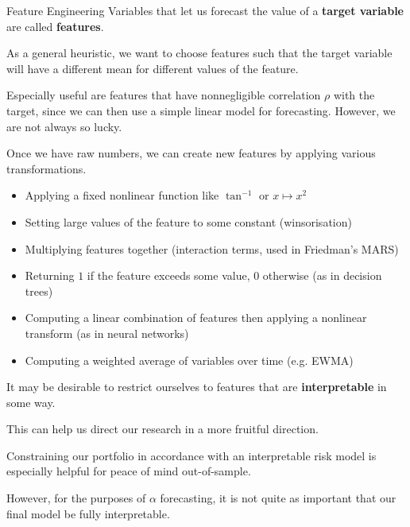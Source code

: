 \documentclass{beamer}
\begin{document}
\begin{frame}{Feature Engineering}
	Variables that let us forecast the value of a \textbf{target variable} are called \textbf{features}.

	As a general heuristic, we want to choose features such that the target variable will have a different mean for different values of the feature.

	Especially useful are features that have nonnegligible correlation $\rho$ with the target, since we can then use a simple linear model for forecasting. However, we are not always so lucky.

	Once we have raw numbers, we can create new features by applying various transformations.

	\begin{itemize}
		\item Applying a fixed nonlinear function like $\tan^{-1}$ or $x\mapsto x^2$
		\item Setting large values of the feature to some constant (winsorisation)
		\item Multiplying features together (interaction terms, used in Friedman's MARS)
		\item Returning $1$ if the feature exceeds some value, $0$ otherwise (as in decision trees)
		\item Computing a linear combination of features then applying a nonlinear transform (as in neural networks) 
		\item Computing a weighted average of variables over time (e.g. EWMA)
	\end{itemize}

	It may be desirable to restrict ourselves to features that are \textbf{interpretable} in some way.

	This can help us direct our research in a more fruitful direction.

	Constraining our portfolio in accordance with an interpretable risk model is especially helpful for peace of mind out-of-sample.

	However, for the purposes of $\alpha$ forecasting, it is not quite as important that our final model be fully interpretable.
\end{frame}
\end{document}
